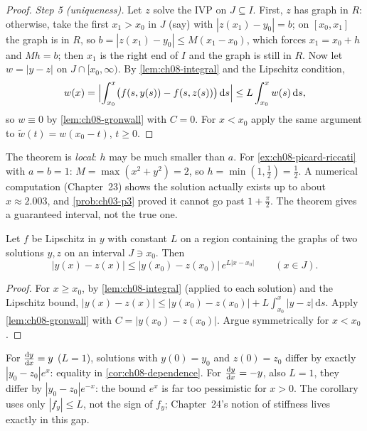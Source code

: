\begin{proof}
\emph{Step 5 (uniqueness).} Let $z$ solve the IVP on $J\subseteq I$. First,
$z$ has graph in $R$: otherwise, take the first $x_1>x_0$ in $J$ (say) with
$|z(x_1) - y_0| = b$; on $[x_0,x_1]$ the graph is in $R$, so
$b = |z(x_1) - y_0|\le M(x_1 - x_0)$, which forces $x_1 = x_0 + h$ and
$Mh = b$; then $x_1$ is the right end of $I$ and the graph is still in $R$.
Now let $w = |y - z|$ on $J\cap[x_0,\infty)$. By \cref{lem:ch08-integral} and
the Lipschitz condition,
\[
  w(x) = \Bigl|\int_{x_0}^{x}\bigl(f(s,y(s)) - f(s,z(s))\bigr)\,\mathrm{d}s\Bigr|
  \le L\int_{x_0}^{x}w(s)\,\mathrm{d}s ,
\]
so $w\equiv0$ by \cref{lem:ch08-gronwall} with $C = 0$. For $x<x_0$ apply the
same argument to $\tilde w(t) = w(x_0 - t)$, $t\ge0$.
\end{proof}

\begin{remark}\label{rem:ch08-local}
The theorem is \emph{local}: $h$ may be much smaller than $a$. For
\cref{ex:ch08-picard-riccati} with $a = b = 1$: $M = \max(x^2 + y^2) = 2$, so
$h = \min(1,\frac12) = \frac12$. A numerical computation (Chapter~23) shows
the solution actually exists up to about $x\approx2.003$, and
\cref{prob:ch03-p3} proved it cannot go past $1 + \frac\pi2$. The theorem
gives a guaranteed interval, not the true one.
\end{remark}

\begin{corollary}\label{cor:ch08-dependence}
Let $f$ be Lipschitz in $y$ with constant $L$ on a region containing the graphs
of two solutions $y, z$ on an interval $J\ni x_0$. Then
\[
  |y(x) - z(x)|\le|y(x_0) - z(x_0)|\,e^{L|x - x_0|}\qquad (x\in J).
\]
\end{corollary}
\begin{proof}
For $x\ge x_0$, by \cref{lem:ch08-integral} (applied to each solution) and the
Lipschitz bound,
$|y(x) - z(x)|\le|y(x_0) - z(x_0)| + L\int_{x_0}^x|y - z|\,\mathrm{d}s$. Apply
\cref{lem:ch08-gronwall} with $C = |y(x_0) - z(x_0)|$. Argue symmetrically for
$x<x_0$.
\end{proof}

\begin{example}\label{ex:ch08-sharp}
For $\frac{\mathrm{d}y}{\mathrm{d}x} = y$ ($L = 1$), solutions with $y(0) = y_0$ and $z(0) = z_0$
differ by exactly $|y_0 - z_0|e^{x}$: equality in
\cref{cor:ch08-dependence}. For $\frac{\mathrm{d}y}{\mathrm{d}x} = -y$, also $L = 1$, they differ by
$|y_0 - z_0|e^{-x}$: the bound $e^{x}$ is far too pessimistic for $x>0$. The
corollary uses only $|f_y|\le L$, not the sign of $f_y$; Chapter~24's notion of
stiffness lives exactly in this gap.
\end{example}

